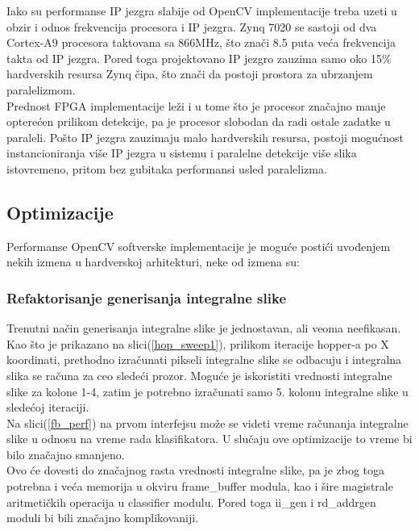 Iako su performanse IP jezgra slabije od OpenCV implementacije treba uzeti u
obzir i odnos frekvencija procesora i IP jezgra.
Zynq 7020 se sastoji od dva Cortex-A9 procesora taktovana sa 866MHz, što znači 8.5
puta veća frekvencija takta od IP jezgra.
Pored toga projektovano IP jezgro zauzima samo oko 15\% hardverskih resursa Zynq
čipa, što znači da postoji prostora za ubrzanjem paralelizmom. \\

Prednost FPGA implementacije leži i u tome što je procesor značajno
manje opterećen prilikom detekcije, pa je procesor slobodan da radi ostale
zadatke u paraleli.
Pošto IP jezgra zauzimaju malo hardverskih resursa, postoji mogućnost
instancioniranja više IP jezgra u sistemu i paralelne detekcije više slika
istovremeno, pritom bez gubitaka performansi usled paralelizma. \\

\subsection{Optimizacije}

Performanse OpenCV softverske implementacije je moguće postići uvođenjem nekih
izmena u hardverskoj arhitekturi, neke od izmena su:

\subsubsection{Refaktorisanje generisanja integralne slike}

Trenutni način generisanja integralne slike je jednostavan, ali veoma neefikasan.\\
Kao što je prikazano na slici(\ref{hop_sweep1}), prilikom iteracije hopper-a
po X koordinati, prethodno izračunati pikseli integralne slike se odbacuju i
integralna slika se računa za ceo sledeći prozor.
Moguće je iskoristiti vrednosti integralne slike za kolone 1-4, zatim je
potrebno izračunati samo 5. kolonu integralne slike u sledećoj iteraciji.\\
Na slici(\ref{fb_perf}) na prvom interfejsu može se videti vreme računanja
integralne slike u odnosu na vreme rada klasifikatora.
U slučaju ove optimizacije to vreme bi bilo značajno smanjeno. \\

Ovo će dovesti do  značajnog rasta vrednosti integralne slike, pa je zbog
toga potrebna i veća memorija u okviru frame\_buffer modula, kao i šire
magistrale aritmetičkih operacija u classifier modulu.
Pored toga ii\_gen i rd\_addrgen moduli bi bili značajno komplikovaniji. \\

